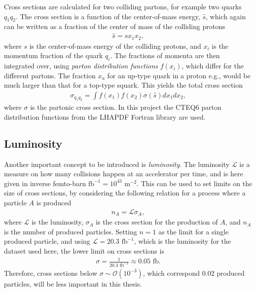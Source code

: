 \documentclass[twoside,english]{uiofysmaster}
\begin{document}
Cross sections are calculated for two colliding partons, for example two quarks $q_1 q_2$. The cross section is a function of the center-of-mass energy, $\hat{s}$, which again can be written as a fraction of the center of mass of the colliding protons
\begin{align}
\hat{s} = s x_1 x_2,
\end{align}
where $s$ is the center-of-mass energy of the colliding protons, and $x_i$ is the momentum fraction of the quark $q_i$. The fractions of momenta are then integrated over, using \textit{parton distribution functions} $f(x_i)$, which differ for the different partons. The fraction $x_u$ for an up-type quark in a proton e.g., would be much larger than that for a top-type squark. This yields the total cross section
\begin{align}
\sigma_{q_1q_2} = \int f(x_1) f(x_2) \sigma(\hat{s}) dx_1 dx_2,
\end{align}
where $\sigma$ is the partonic cross section. In this project the CTEQ6 parton distribution functions from the LHAPDF Fortran library \cite{PhysRevD.78.013004} are used.

\subsection{Luminosity}

Another important concept to be introduced is \textit{luminosity}. The luminosity $\mathcal{L}$ is a measure on how many collisions happen at an accelerator per time, and is here given in inverse femto-barn $\text{fb}^{-1} = 10^{43} \text{ m}^{-2}$. This can be used to set limits on the size of cross sections, by considering the following relation for a process where a particle $A$ is produced
\begin{align}
n_{A} = \mathcal{L} \sigma_{A} ,
\end{align}
where $\mathcal{L}$ is the luminosity, $\sigma_{A}$ is the cross section for the production of $A$, and $n_A$ is the number of produced particles. Setting $n=1$ as the limit for a single produced particle, and using $\mathcal{L} = 20.3 \text{ fb}^{-1}$, which is the luminosity for the dataset used here, the lower limit on cross sections is
\begin{align}
\sigma  = \frac{1}{20.3 \text{ fb}^{-1}} \approx 0.05 \text{ fb}.
\end{align}
Therefore, cross sections below $\sigma \sim \mathcal{O}(10^{-3})$, which correspond $0.02$ produced particles, will be less important in this thesis.
\end{document}
